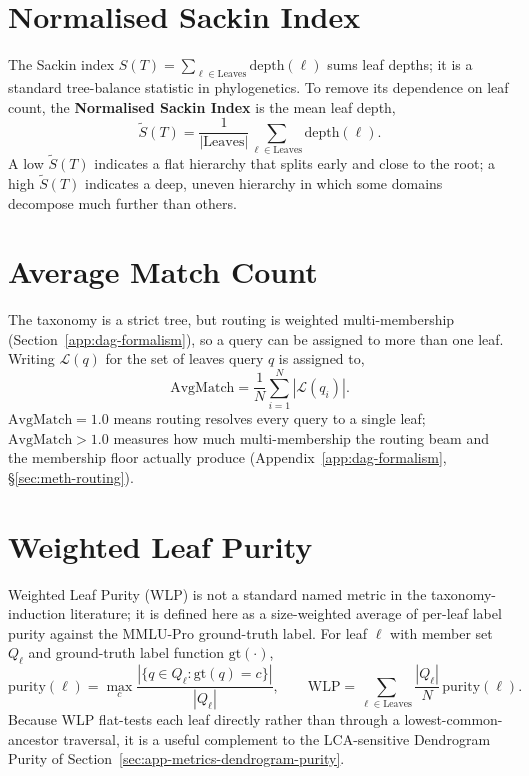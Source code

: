 \section{Normalised Sackin Index}\label{sec:app-metrics-sackin}

The Sackin index $S(T) = \sum_{\ell \in \text{Leaves}} \text{depth}(\ell)$
sums leaf depths; it is a standard tree-balance statistic in
phylogenetics. To remove its dependence on leaf count, the
\textbf{Normalised Sackin Index} is the mean leaf depth,
\[
\tilde{S}(T) = \frac{1}{|\text{Leaves}|} \sum_{\ell \in \text{Leaves}} \text{depth}(\ell).
\]
A low $\tilde{S}(T)$ indicates a flat hierarchy that splits early and
close to the root; a high $\tilde{S}(T)$ indicates a deep, uneven
hierarchy in which some domains decompose much further than others.

\section{Average Match Count}\label{sec:app-metrics-avgmatch}

The taxonomy is a strict tree, but routing is weighted
multi-membership (Section~\ref{app:dag-formalism}), so a query can
be assigned to more than one leaf. Writing $\mathcal{L}(q)$ for the
set of leaves query $q$ is assigned to,
\[
\text{AvgMatch} = \frac{1}{N} \sum_{i=1}^{N} |\mathcal{L}(q_i)|.
\]
$\text{AvgMatch} = 1.0$ means routing resolves every query to a single
leaf; $\text{AvgMatch} > 1.0$ measures how much multi-membership the
routing beam and the membership floor actually produce
(Appendix~\ref{app:dag-formalism}, \S\ref{sec:meth-routing}).

\section{Weighted Leaf Purity}\label{sec:app-metrics-wlp}

Weighted Leaf Purity (WLP) is not a standard named metric in the
taxonomy-induction literature; it is defined here as a size-weighted
average of per-leaf label purity against the MMLU-Pro ground-truth
label. For leaf $\ell$ with member set $Q_\ell$ and ground-truth label
function $\text{gt}(\cdot)$,
\[
\text{purity}(\ell) = \max_{c} \frac{|\{q \in Q_\ell : \text{gt}(q) = c\}|}{|Q_\ell|},
\qquad
\text{WLP} = \sum_{\ell \in \text{Leaves}} \frac{|Q_\ell|}{N} \, \text{purity}(\ell).
\]
Because WLP flat-tests each leaf directly rather than through a
lowest-common-ancestor traversal, it is a useful complement to
the LCA-sensitive Dendrogram Purity of
Section~\ref{sec:app-metrics-dendrogram-purity}.

